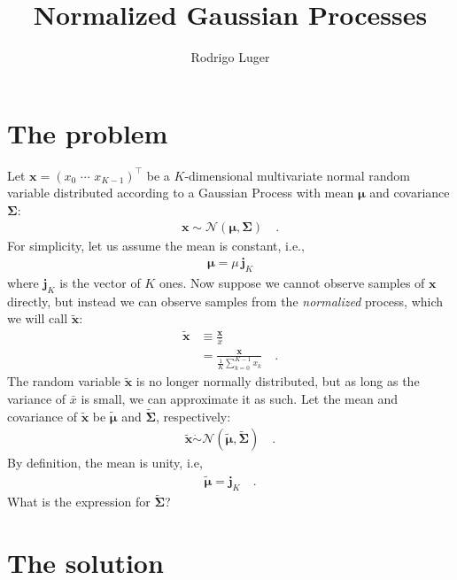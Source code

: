 \documentclass[modern]{aastex62}
\begin{document}
\title{%
    \textbf{
        Normalized Gaussian Processes
    }
}

\author{Rodrigo Luger}

\section{The problem}

Let $\mathbf{x} = \left( x_0 \,\, \cdots \,\, x_{K-1} \right)^\top$
be a $K$-dimensional multivariate normal random variable distributed
according to a Gaussian Process with mean $\pmb{\mu}$
and covariance $\pmb{\Sigma}$:
%
\begin{align}
    \mathbf{x} \sim \mathcal{N}\left( \pmb{\mu}, \pmb{\Sigma} \right)
    \quad.
\end{align}
%
For simplicity, let us assume the mean is constant, i.e.,
%
\begin{align}
    \pmb{\mu} = \mu \, \mathbf{j}_K
\end{align}
%
where $\mathbf{j}_K$ is the vector of $K$ ones.
%
Now suppose we cannot observe samples of $\mathbf{x}$ directly, but instead we can
observe samples from the \emph{normalized} process, which we will call
$\tilde{\mathbf{x}}$:
%
\begin{align}
    \tilde{\mathbf{x}}
     & \equiv \frac{\mathbf{x}}{\bar{x}}
    \nonumber                                                      \\[0.5em]
     & = \frac{\mathbf{x}}{\frac{1}{K}\sum\limits_{k=0}^{K-1} x_k}
    \quad.
\end{align}
%
The random variable $\tilde{\mathbf{x}}$ is no longer normally distributed, but as long as
the variance of $\bar{x}$ is small, we can approximate it as such. Let the mean
and covariance of $\tilde{\mathbf{x}}$ be $\tilde{\pmb{\mu}}$ and $\tilde{\pmb{\Sigma}}$, respectively:
%
\begin{align}
    \tilde{\mathbf{x}} \mathrel{\dot\sim} \mathcal{N}\left( \tilde{\pmb{\mu}}, \tilde{\pmb{\Sigma}} \right)
    \quad.
\end{align}
%
By definition, the mean is unity, i.e,
%
\begin{align}
    \tilde{\pmb{\mu}} = \mathbf{j}_K
    \quad.
\end{align}
%
What is the expression for $\tilde{\pmb{\Sigma}}$?

\section{The solution}
\end{document}
